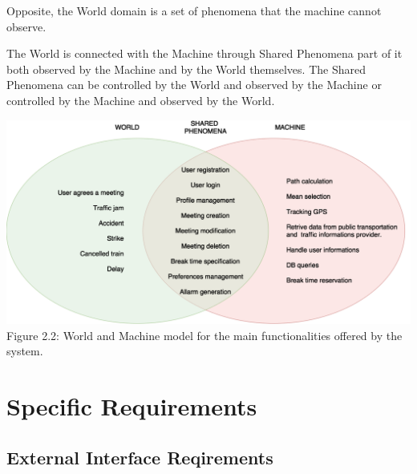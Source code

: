 \documentclass{article}
\begin{document}
	\bigskip
	Opposite, the World domain is a set of phenomena that the machine cannot observe.

	\bigskip
	The World is connected with the Machine through Shared Phenomena part of it both observed by the Machine and by the World themselves. The Shared Phenomena can be controlled by the World and observed by the Machine or controlled by the Machine and observed by the World.
	
	\bigskip
	\bigskip
	\begin{center}
		\includegraphics[width=\textwidth]{img/diagrams/world_machine.png} \\ \bigskip
		Figure 2.2: World and Machine model for the main functionalities offered by the system.
	\end{center}
	
	\section{Specific Requirements}
	
	
	\subsection{External Interface Reqirements}
	
	
\end{document}
